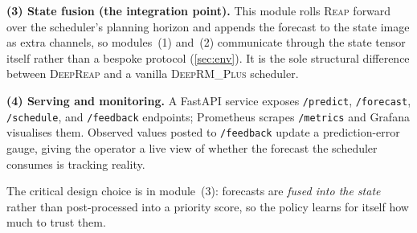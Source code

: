 \documentclass[runningheads]{llncs}
\newcommand{\reap}{\textsc{Reap}}
\newcommand{\deeprm}{\textsc{DeepRM\_Plus}}
\newcommand{\deepreap}{\textsc{DeepReap}}
\begin{document}
\textbf{(3) State fusion (the integration point).} This module rolls
\reap{} forward over the scheduler's planning horizon and appends the
forecast to the state image as extra channels, so modules~(1) and~(2)
communicate through the state tensor itself rather than a bespoke
protocol (\cref{sec:env}). It is the sole structural difference between
\deepreap{} and a vanilla \deeprm{} scheduler.

\textbf{(4) Serving and monitoring.} A FastAPI service exposes
\texttt{/predict}, \texttt{/forecast}, \texttt{/schedule}, and
\texttt{/feedback} endpoints; Prometheus scrapes \texttt{/metrics} and
Grafana visualises them. Observed values posted to \texttt{/feedback}
update a prediction-error gauge, giving the operator a live view of
whether the forecast the scheduler consumes is tracking reality.

The critical design choice is in module~(3): forecasts are \emph{fused
into the state} rather than post-processed into a priority score, so
the policy learns for itself how much to trust them.
\end{document}
